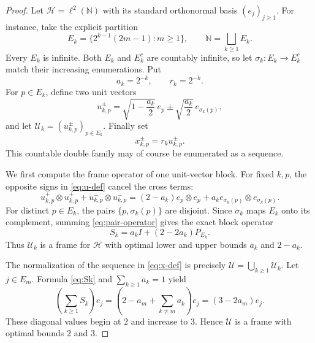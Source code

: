 \documentclass[11pt]{article}
\newcommand{\N}{\mathbb N}
\newcommand{\Hh}{\mathcal H}
\newcommand{\cU}{\mathcal U}
\begin{document}
\begin{proof}
Let $\Hh=\ell^2(\N)$ with its standard orthonormal basis $(e_j)_{j\ge1}$.
For instance, take the explicit partition
\[
 E_k=\{2^{k-1}(2m-1):m\ge1\},\qquad
 \N=\bigsqcup_{k\ge1}E_k.
\]
Every $E_k$ is infinite.  Both $E_k$ and $E_k^c$ are countably
infinite, so let $\sigma_k:E_k\to E_k^c$ match their increasing
enumerations.  Put
\[
 a_k=2^{-k},\qquad r_k=2^{-k}.
\]
For $p\in E_k$, define two unit vectors
\begin{equation}\label{eq:u-def}
 u_{k,p}^{\pm}
 =\sqrt{1-\frac{a_k}{2}}\,e_p
 \mathbin{\pm}\sqrt{\frac{a_k}{2}}\,e_{\sigma_k(p)},
\end{equation}
and let $\cU_k=(u_{k,p}^{\pm})_{p\in E_k}$.  Finally set
\begin{equation}\label{eq:x-def}
 x_{k,p}^{\pm}=r_k u_{k,p}^{\pm}.
\end{equation}
This countable double family may of course be enumerated as a sequence.

We first compute the frame operator of one unit-vector block.  For fixed
$k,p$, the opposite signs in \eqref{eq:u-def} cancel the cross terms:
\begin{equation}\label{eq:pair-operator}
 u_{k,p}^{+}\otimes u_{k,p}^{+}
 +u_{k,p}^{-}\otimes u_{k,p}^{-}
 =(2-a_k)e_p\otimes e_p
 +a_k e_{\sigma_k(p)}\otimes e_{\sigma_k(p)}.
\end{equation}
For distinct $p\in E_k$, the pairs
$\{p,\sigma_k(p)\}$ are disjoint.  Since $\sigma_k$ maps $E_k$ onto its
complement, summing \eqref{eq:pair-operator} gives the exact block operator
\begin{equation}\label{eq:Sk}
 S_k=a_kI+(2-2a_k)P_{E_k}.
\end{equation}
Thus $\cU_k$ is a frame for $\Hh$ with optimal lower and upper bounds
$a_k$ and $2-a_k$.

The normalization of the sequence in \eqref{eq:x-def} is precisely
$\cU=\bigcup_{k\ge1}\cU_k$.  Let $j\in E_m$.  Formula \eqref{eq:Sk} and
$\sum_{k\ge1}a_k=1$ yield
\begin{equation}\label{eq:normalized-eigenvalue}
 \left(\sum_{k\ge1}S_k\right)e_j
 =\left(2-a_m+\sum_{k\ne m}a_k\right)e_j
 =(3-2a_m)e_j.
\end{equation}
These diagonal values begin at $2$ and increase to $3$.  Hence $\cU$ is a
frame with optimal bounds $2$ and $3$.


\end{proof}
\end{document}
